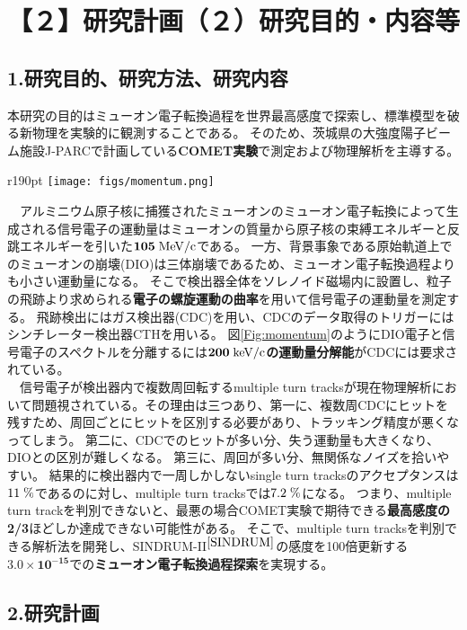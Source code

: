\documentclass[11pt,a4j,dvipdfmx]{jarticle} 					%
\newcommand{\研究課題名}{ミューオン電子転換探索の感度向上に向けた解析手法の開発}
\newcommand{\研究機関名}{大阪大学}
\newcommand{\研究代表者氏名}{高見 翔太   }
\newcommand{\mysubsection}[1]{\vspace{-20pt}\subsection*{\colorbox{cyan!15}{\normalsize{#1}}}\vspace{-0.2cm}}
\begin{document}
\section{【２】研究計画（２）研究目的・内容等}
\mysubsection{1.研究目的、研究方法、研究内容}
本研究の目的はミューオン電子転換過程を世界最高感度で探索し、標準模型を破る新物理を実験的に観測することである。
そのため、茨城県の大強度陽子ビーム施設J-PARCで計画している\textbf{COMET実験}で測定および物理解析を主導する。\\
\begin{wrapfigure}[12]{r}{190pt}{}
	\centering
	 \vspace{-1.2cm}
	 \hspace*{-15pt}
	 \texttt{[image: figs/momentum.png]}
	 \vspace{-1.0cm}
	 \caption{\small{信号電子の運動量分布}}
	 \label{Fig:momentum}
	\end{wrapfigure} 
　アルミニウム原子核に捕獲されたミューオンのミューオン電子転換によって生成される信号電子の運動量はミューオンの質量から原子核の束縛エネルギーと反跳エネルギーを引いた$\mathbf{105\;\rm{MeV/c}}$である。
一方、背景事象である原始軌道上でのミューオンの崩壊(DIO)は三体崩壊であるため、ミューオン電子転換過程よりも小さい運動量になる。
そこで検出器全体をソレノイド磁場内に設置し、粒子の飛跡より求められる\textbf{電子の螺旋運動の曲率}を用いて信号電子の運動量を測定する。
飛跡検出にはガス検出器(CDC)を用い、CDCのデータ取得のトリガーにはシンチレーター検出器CTHを用いる。
図\ref{Fig:momentum}のようにDIO電子と信号電子のスペクトルを分離するには$\mathbf{200\;\rm{keV/c}}$\textbf{の運動量分解能}がCDCには要求されている。\\
　信号電子が検出器内で複数周回転するmultiple turn tracksが現在物理解析において問題視されている。その理由は三つあり、第一に、複数周CDCにヒットを残すため、周回ごとにヒットを区別する必要があり、トラッキング精度が悪くなってしまう。
第二に、CDCでのヒットが多い分、失う運動量も大きくなり、DIOとの区別が難しくなる。
第三に、周回が多い分、無関係なノイズを拾いやすい。
結果的に検出器内で一周しかしないsingle turn tracksのアクセプタンスは$11\;\rm{\%}$であるのに対し、multiple turn tracksでは$7.2\;\rm{\%}$になる。
つまり、multiple turn trackを判別できないと、最悪の場合COMET実験で期待できる\textbf{最高感度の2/3}ほどしか達成できない可能性がある。
そこで、multiple turn tracksを判別できる解析法を開発し、\mbox{SINDRUM-I\hspace{-1.2pt}I$^{\cite{SINDRUM}}$}の感度を100倍更新する$\mathbf{3.0 \times 10^{-15}}$での\textbf{ミューオン電子転換過程探索}を実現する。\\
\vspace{-0.5cm}
\mysubsection{2.研究計画}
\end{document}
